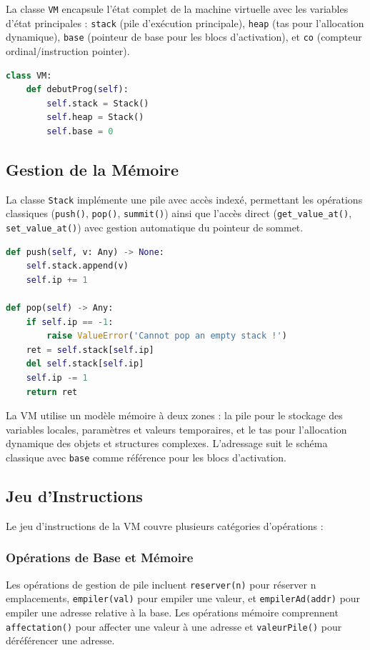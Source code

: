 \documentclass[a4paper, 12pt]{article}
\begin{document}
    La classe \texttt{VM} encapsule l'état complet de la machine virtuelle avec les variables d'état principales : \texttt{stack} (pile d'exécution principale), \texttt{heap} (tas pour l'allocation dynamique), \texttt{base} (pointeur de base pour les blocs d'activation), et \texttt{co} (compteur ordinal/instruction pointer).

    \begin{lstlisting}[caption=Structure principale de la VM,language=python, xleftmargin=20pt]
class VM:
    def debutProg(self):
        self.stack = Stack()
        self.heap = Stack()
        self.base = 0 \end{lstlisting}

    \subsection{Gestion de la Mémoire}

    La classe \texttt{Stack} implémente une pile avec accès indexé, permettant les opérations classiques (\texttt{push()}, \texttt{pop()}, \texttt{summit()}) ainsi que l'accès direct (\texttt{get\_value\_at()}, \texttt{set\_value\_at()}) avec gestion automatique du pointeur de sommet.

    \begin{lstlisting}[caption=Implémentation de la pile,language=python, xleftmargin=20pt]
def push(self, v: Any) -> None:
    self.stack.append(v)
    self.ip += 1

def pop(self) -> Any:
    if self.ip == -1:
        raise ValueError('Cannot pop an empty stack !')
    ret = self.stack[self.ip]
    del self.stack[self.ip]
    self.ip -= 1
    return ret \end{lstlisting}

    La VM utilise un modèle mémoire à deux zones : la pile pour le stockage des variables locales, paramètres et valeurs temporaires, et le tas pour l'allocation dynamique des objets et structures complexes. L'adressage suit le schéma classique avec \texttt{base} comme référence pour les blocs d'activation.

    \subsection{Jeu d'Instructions}

    Le jeu d'instructions de la VM couvre plusieurs catégories d'opérations :

    \subsubsection{Opérations de Base et Mémoire}
    Les opérations de gestion de pile incluent \texttt{reserver(n)} pour réserver n emplacements, \texttt{empiler(val)} pour empiler une valeur, et \texttt{empilerAd(addr)} pour empiler une adresse relative à la base. Les opérations mémoire comprennent \texttt{affectation()} pour affecter une valeur à une adresse et \texttt{valeurPile()} pour déréférencer une adresse.
\end{document}
